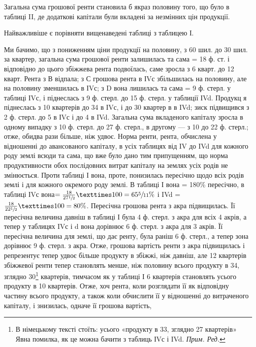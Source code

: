 Загальна сума грошової ренти становила б якраз половину того, що було
в таблиці II, де додаткові капітали були вкладені за незмінних цін продукції.

Найважливіше є порівняти вищенаведені таблиці з таблицею І.

Ми бачимо, що з пониженням ціни продукції на половину, з 60 шил. до
30 шил. за квартер, загальна сума грошової ренти залишилась та сама = 18 ф.
ст. і відповідно до цього збіжжева рента подвоїлась, саме зросла з 6 кварт. до
12 кварт. Рента з В відпала; з С грошова рента в ІVс збільшилась на половину,
але на половину зменшилась в ІVс; з D вона лишилась та сама = 9 ф.
стерл. у таблиці ІVс, і піднеслась з 9 ф. стерл. до 15 ф. стерл. у таблиції ІVd.
Продукц я піднеслась з 10 квартерів до 34 в ІVс, і до 30 квартер в в IVd;
зиск підвищився з 2 ф. стерл. до 5 в ІVс і до 4  в IVd. Загальна сума
вкладеного капіталу зросла в одному випадку з 10 ф. стерл. до 27 ф. стерл.,
в другому — з 10 до 22 ф. стерл.; отже, обидва рази більше, ніж удвоє. Норма
ренти, рента, обчислена у відношенні до авансованого капіталу, в усіх таблицях
від IV до IVd для кожного роду землі всюди та сама, що вже було дано тим припущенням,
що норма продуктивности обох послідовних витрат капіталу на землях
усіх родів не змінюється. Проти таблиці І вона, проте, понизилась пересічно
щодо всіх родів землі і для кожного окремого роду землі. В таблиці І вона =
180\% пересічно, в таблиці ІVс вона$ = \frac{18}{27\sfrac{1}{2}} × 100 = 65\sfrac{5}{11}\%$ і
IVd = $\frac{18}{22\sfrac{1}{2}} × 100 = 80\%$. Пересічна грошова рента з акра підвищилась. Її пересічна
величина давніш в таблиці І була 4 ф. стерл. з акра для всіх 4 акрів,
а тепер у таблицях IVс і d вона дорівнює 6 ф. стерл. з акра для 3 акрів.
Її пересічна величина для землі, що дає ренту, була раніш 6 ф. стерл., а тепер
зона дорівнює 9 ф. стерл. з акра. Отже, грошова вартість ренти з акра підвищилась
і репрезентує тепер удвоє більше продукту в збіжжі, ніж давніш, але
12 квартерів збіжжевої ренти тепер становлять менше, ніж половину всього продукту
в 34, зглядно 30\footnote*{В німецькому тексті стоїть: усього «продукту в 33, зглядно 27 квартерів» Явна помилка,
як це можна бачити з таблиць ІVс і IVd. \emph{Прим. Ред.}} квартерів, тимчасом як у таблиці І 6 квартерів становлять
  усього продукту в 10 квартерів. Отже, хоч рента, коли розглядати
її як відповідну частину всього продукту, а також коли обчислити її у відношенні
до витраченого капіталу, і знизилась, одначе її грошова вартість,
